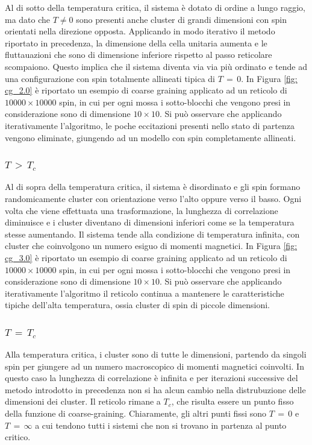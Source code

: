 Al di sotto della temperatura critica, il sistema è dotato di ordine a lungo raggio, ma dato che $T \neq 0$ sono presenti anche cluster 
di grandi dimensioni con spin orientati nella direzione opposta. Applicando in modo iterativo il metodo riportato in precedenza, la 
dimensione della cella unitaria aumenta e le fluttauazioni che sono di dimensione inferiore rispetto al passo reticolare scompaiono. 
Questo implica che il sistema diventa via via più ordinato e tende ad una configurazione con spin totalmente allineati tipica di 
$T\,=\,0$. In Figura \ref{fig: cg_2.0} è riportato un esempio di coarse graining applicato ad un reticolo di $10000 \times 10000$ 
spin, in cui per ogni mossa i sotto-blocchi che vengono presi in considerazione sono di dimensione $10 \times 10$. Si può osservare 
che applicando iterativamente l'algoritmo, le poche eccitazioni presenti nello stato di partenza vengono eliminate, giungendo ad un 
modello con spin completamente allineati. 



\subsubsection{$T\,>\,T_c$}

Al di sopra della temperatura critica, il sistema è disordinato e gli spin formano randomicamente cluster con orientazione verso 
l'alto oppure verso il basso. Ogni volta che viene effettuata una trasformazione, la lunghezza di correlazione diminuisce e i cluster 
diventano di dimensioni inferiori come se la temperatura stesse aumentando. Il sistema tende alla condizione di temperatura infinita, 
con cluster che coinvolgono un numero esiguo di momenti magnetici. In Figura \ref{fig: cg_3.0} è riportato un esempio di coarse graining 
applicato ad un reticolo di $10000 \times 10000$ spin, in cui per ogni mossa i sotto-blocchi che vengono presi in considerazione sono 
di dimensione $10 \times 10$. Si può osservare che applicando iterativamente l'algoritmo il reticolo continua a mantenere le caratteristiche 
tipiche dell'alta temperatura, ossia cluster di spin di piccole dimensioni.



\subsubsection{$T\,=\,T_c$}

Alla temperatura critica, i cluster sono di tutte le dimensioni, partendo da singoli spin per giungere ad un numero macroscopico di 
momenti magnetici coinvolti. In questo caso la lunghezza di correlazione è infinita e per iterazioni successive del metodo introdotto 
in precedenza non si ha alcun cambio nella distrubuzione delle dimensioni dei cluster. Il reticolo rimane a $T_c$, che risulta essere 
un punto fisso della funzione di coarse-graining. Chiaramente, gli altri punti fissi sono $T\,=\,0$ e $T\,=\,\infty$ a cui tendono 
tutti i sistemi che non si trovano in partenza al punto critico.


